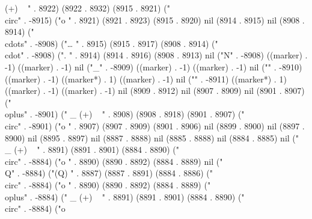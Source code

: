 (+)
 ~
" . 8922) (8922 . 8932) (8915 . 8921) ("\\circ" . -8915) ("o
" . 8921) (8921 . 8923) (8915 . 8920) nil (8914 . 8915) nil (8908 . 8914) ("\\cdots" . -8908) ("…
" . 8915) (8915 . 8917) (8908 . 8914) ("\\cdot" . -8908) (".
" . 8914) (8914 . 8916) (8908 . 8913) nil ("N" . -8908) ((marker) . -1) ((marker) . -1) nil ("_" . -8909) ((marker) . -1) ((marker) . -1) nil ("{" . -8910) ((marker) . -1) ((marker*) . 1) ((marker) . -1) nil ("}" . -8911) ((marker*) . 1) ((marker) . -1) ((marker) . -1) nil (8909 . 8912) nil (8907 . 8909) nil (8901 . 8907) ("\\oplus" . -8901) (" _
(+)
 ~
" . 8908) (8908 . 8918) (8901 . 8907) ("\\circ" . -8901) ("o
" . 8907) (8907 . 8909) (8901 . 8906) nil (8899 . 8900) nil (8897 . 8900) nil (8895 . 8897) nil (8887 . 8888) nil (8885 . 8888) nil (8884 . 8885) nil (" _
(+)
 ~
" . 8891) (8891 . 8901) (8884 . 8890) ("\\circ" . -8884) ("o
" . 8890) (8890 . 8892) (8884 . 8889) nil ("\\Q" . -8884) ("(Q)
" . 8887) (8887 . 8891) (8884 . 8886) ("\\circ" . -8884) ("o
" . 8890) (8890 . 8892) (8884 . 8889) ("\\oplus" . -8884) (" _
(+)
 ~
" . 8891) (8891 . 8901) (8884 . 8890) ("\\circ" . -8884) ("o
